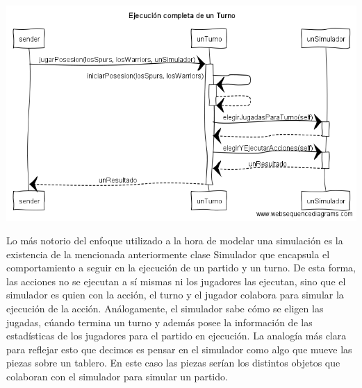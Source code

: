\begin{center}
\includegraphics[scale=0.4]{diseno/Ejecucion_completa_de_un_turno.png}
\end{center}


Lo más notorio del enfoque utilizado a la hora de modelar una simulación es la existencia de la mencionada anteriormente clase Simulador que encapsula el comportamiento a seguir en la ejecución de un partido y un turno.
De esta forma, las acciones no se ejecutan a sí mismas ni los jugadores las ejecutan, sino que el simulador es quien con la acción, el turno y el jugador colabora para simular la ejecución de la acción. Análogamente, el simulador sabe cómo se eligen las jugadas, cúando termina un turno y además posee la información de las estadísticas de los jugadores para el partido en ejecución.
La analogía más clara para reflejar esto que decimos es pensar en el simulador como algo que mueve las piezas sobre un tablero. En este caso las piezas serían los distintos objetos que colaboran con el simulador para simular un partido.\\
